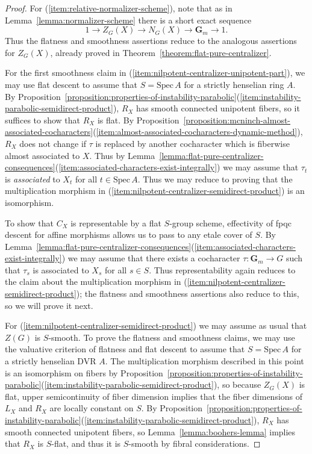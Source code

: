 \documentclass[11pt,reqno]{amsart}
\theoremstyle{definition}
\newcommand{\Spec}{\mathrm{Spec} \,}
\newcommand{\bG}{{\mathbf G}}
\begin{document}
\begin{proof}
For (\ref{item:relative-normalizer-scheme}), note that as in Lemma~\ref{lemma:normalizer-scheme} there is a short exact sequence
\[
1 \to Z_G(X) \to N_G(X) \to \bG_m \to 1.
\]
Thus the flatness and smoothness assertions reduce to the analogous assertions for $Z_G(X)$, already proved in Theorem~\ref{theorem:flat-pure-centralizer}. \smallskip

For the first smoothness claim in (\ref{item:nilpotent-centralizer-unipotent-part}), we may use flat descent to assume that $S = \Spec A$ for a strictly henselian ring $A$. By Proposition~\ref{proposition:properties-of-instability-parabolic}(\ref{item:instability-parabolic-semidirect-product}), $R_X$ has smooth connected unipotent fibers, so it suffices to show that $R_X$ is flat. By Proposition~\ref{proposition:mcninch-almost-associated-cocharacters}(\ref{item:almost-associated-cocharacters-dynamic-method}), $R_X$ does not change if $\tau$ is replaced by another cocharacter which is fiberwise almost associated to $X$. Thus by Lemma~\ref{lemma:flat-pure-centralizer-consequences}(\ref{item:associated-characters-exist-integrally}) we may assume that $\tau_t$ is \textit{associated} to $X_t$ for all $t \in \Spec A$. Thus we may reduce to proving that the multiplication morphism in (\ref{item:nilpotent-centralizer-semidirect-product}) is an isomorphism. \smallskip

To show that $C_X$ is representable by a flat $S$-group scheme, effectivity of fpqc descent for affine morphisms \cite[Exp.\ VIII, Cor.\ 7.9]{SGA1} allows us to pass to any etale cover of $S$. By Lemma~\ref{lemma:flat-pure-centralizer-consequences}(\ref{item:associated-characters-exist-integrally}) we may assume that there exists a cocharacter $\tau: \bG_m \to G$ such that $\tau_s$ is associated to $X_s$ for all $s \in S$. Thus representability again reduces to the claim about the multiplication morphism in (\ref{item:nilpotent-centralizer-semidirect-product}); the flatness and smoothness assertions also reduce to this, so we will prove it next. \smallskip

For (\ref{item:nilpotent-centralizer-semidirect-product}) we may assume as usual that $Z(G)$ is $S$-smooth. To prove the flatness and smoothness claims, we may use the valuative criterion of flatness \cite[IV\textsubscript{3}, Thm.\ 11.8.1]{EGA} and flat descent to assume that $S = \Spec A$ for a strictly henselian DVR $A$. The multiplication morphism described in this point is an isomorphism on fibers by Proposition~\ref{proposition:properties-of-instability-parabolic}(\ref{item:instability-parabolic-semidirect-product}), so because $Z_G(X)$ is flat, upper semicontinuity of fiber dimension implies that the fiber dimensions of $L_X$ and $R_X$ are locally constant on $S$. By Proposition~\ref{proposition:properties-of-instability-parabolic}(\ref{item:instability-parabolic-semidirect-product}), $R_X$ has smooth connected unipotent fibers, so Lemma~\ref{lemma:boohers-lemma} implies that $R_X$ is $S$-flat, and thus it is $S$-smooth by fibral considerations. \smallskip


\end{proof}
\end{document}
